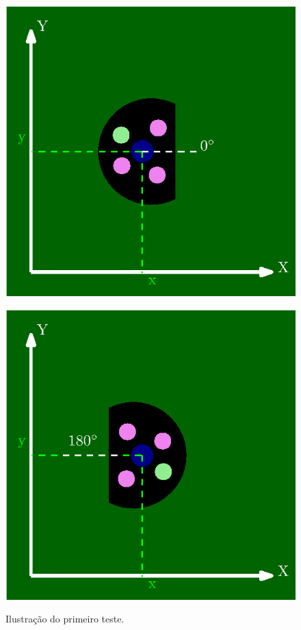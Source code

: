\documentclass[acronym, symbols, table]{fei}
\begin{document}
		\begin{figure}[!htb]
			\caption{Ilustração do primeiro teste.}%
			\label{fig:metodologia_teste_1}
			\begin{minipage}{0.45\textwidth}
				\centering
				\includegraphics[width=\linewidth]{teste_1_0_graus.eps}
				\label{fig:metodologia_teste_1_a}
			\end{minipage}
			\hfill
			\begin{minipage}{0.45\textwidth}
				\centering
				\includegraphics[width=\linewidth]{teste_1_180_graus.eps}
				\label{fig:metodologia_teste_1_b}
			\end{minipage}
		\end{figure}
		
\end{document}
